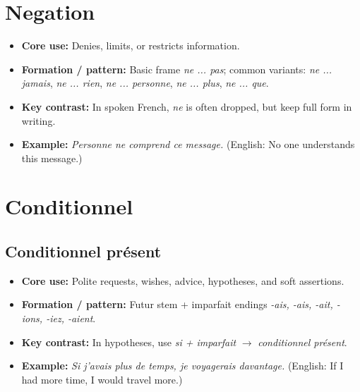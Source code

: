 \documentclass{article}
\begin{document}
\section{Negation}
\begin{itemize}
    \item \textbf{Core use:} Denies, limits, or restricts information.
    \item \textbf{Formation / pattern:} Basic frame \textit{ne ... pas}; common variants: \textit{ne ... jamais}, \textit{ne ... rien}, \textit{ne ... personne}, \textit{ne ... plus}, \textit{ne ... que}.
    \item \textbf{Key contrast:} In spoken French, \textit{ne} is often dropped, but keep full form in writing.
    \item \textbf{Example:} \textit{Personne ne comprend ce message.} (English: No one understands this message.)
\end{itemize}

\section{Conditionnel}

\subsection{Conditionnel présent}
\begin{itemize}
    \item \textbf{Core use:} Polite requests, wishes, advice, hypotheses, and soft assertions.
    \item \textbf{Formation / pattern:} Futur stem + imparfait endings \textit{-ais, -ais, -ait, -ions, -iez, -aient}.
    \item \textbf{Key contrast:} In hypotheses, use \textit{si + imparfait} $\to$ \textit{conditionnel présent}.
    \item \textbf{Example:} \textit{Si j'avais plus de temps, je voyagerais davantage.} (English: If I had more time, I would travel more.)
\end{itemize}
\end{document}
